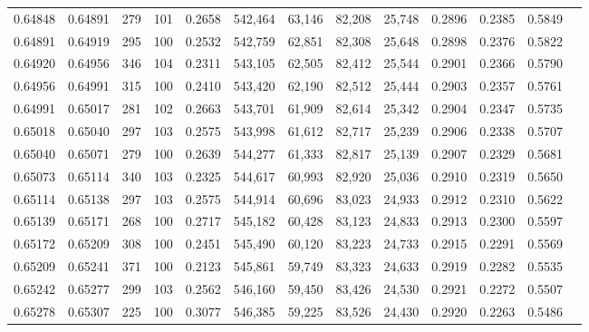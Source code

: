 \begin{tabular}{rrrrrrrrrrrrr}
0.64848 & 0.64891 &   279 & 101 &                                     0.2658 & 542,464 &  63,146 &  82,208 &  25,748 & 0.2896 & 0.2385 & 0.5849 \\
0.64891 & 0.64919 &   295 & 100 &                                     0.2532 & 542,759 &  62,851 &  82,308 &  25,648 & 0.2898 & 0.2376 & 0.5822 \\
0.64920 & 0.64956 &   346 & 104 &                                     0.2311 & 543,105 &  62,505 &  82,412 &  25,544 & 0.2901 & 0.2366 & 0.5790 \\
0.64956 & 0.64991 &   315 & 100 &                                     0.2410 & 543,420 &  62,190 &  82,512 &  25,444 & 0.2903 & 0.2357 & 0.5761 \\
0.64991 & 0.65017 &   281 & 102 &                                     0.2663 & 543,701 &  61,909 &  82,614 &  25,342 & 0.2904 & 0.2347 & 0.5735 \\
0.65018 & 0.65040 &   297 & 103 &                                     0.2575 & 543,998 &  61,612 &  82,717 &  25,239 & 0.2906 & 0.2338 & 0.5707 \\
0.65040 & 0.65071 &   279 & 100 &                                     0.2639 & 544,277 &  61,333 &  82,817 &  25,139 & 0.2907 & 0.2329 & 0.5681 \\
0.65073 & 0.65114 &   340 & 103 &                                     0.2325 & 544,617 &  60,993 &  82,920 &  25,036 & 0.2910 & 0.2319 & 0.5650 \\
0.65114 & 0.65138 &   297 & 103 &                                     0.2575 & 544,914 &  60,696 &  83,023 &  24,933 & 0.2912 & 0.2310 & 0.5622 \\
0.65139 & 0.65171 &   268 & 100 &                                     0.2717 & 545,182 &  60,428 &  83,123 &  24,833 & 0.2913 & 0.2300 & 0.5597 \\
0.65172 & 0.65209 &   308 & 100 &                                     0.2451 & 545,490 &  60,120 &  83,223 &  24,733 & 0.2915 & 0.2291 & 0.5569 \\
0.65209 & 0.65241 &   371 & 100 &                                     0.2123 & 545,861 &  59,749 &  83,323 &  24,633 & 0.2919 & 0.2282 & 0.5535 \\
0.65242 & 0.65277 &   299 & 103 &                                     0.2562 & 546,160 &  59,450 &  83,426 &  24,530 & 0.2921 & 0.2272 & 0.5507 \\
0.65278 & 0.65307 &   225 & 100 &                                     0.3077 & 546,385 &  59,225 &  83,526 &  24,430 & 0.2920 & 0.2263 & 0.5486 \\

\end{tabular}
